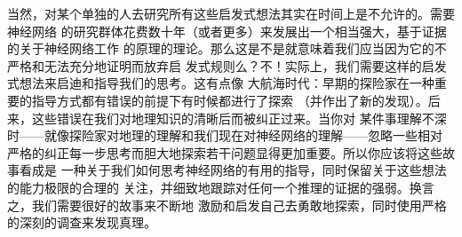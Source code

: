 当然，对某个单独的人去研究所有这些启发式想法其实在时间上是不允许的。需要神经网络
的研究群体花费数十年（或者更多）来发展出一个相当强大，基于证据的关于神经网络工作
的原理的理论。那么这是不是就意味着我们应当因为它的不严格和无法充分地证明而放弃启
发式规则么？不！实际上，我们需要这样的启发式想法来启迪和指导我们的思考。这有点像
大航海时代：早期的探险家在一种重要的指导方式都有错误的前提下有时候都进行了探索
（并作出了新的发现）。后来，这些错误在我们对地理知识的清晰后而被纠正过来。当你对
某件事理解不深时——就像探险家对地理的理解和我们现在对神经网络的理解——忽略一些相对
严格的纠正每一步思考而胆大地探索若干问题显得更加重要。所以你应该将这些故事看成是
一种关于我们如何思考神经网络的有用的指导，同时保留关于这些想法的能力极限的合理的
关注，并细致地跟踪对任何一个推理的证据的强弱。换言之，我们需要很好的故事来不断地
激励和启发自己去勇敢地探索，同时使用严格的深刻的调查来发现真理。
